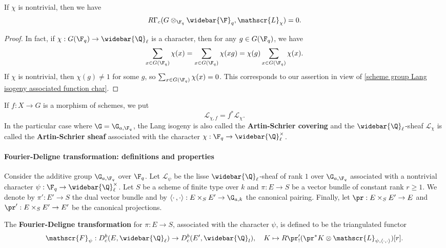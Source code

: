 \begin{proposition}\label{scheme group Lang isogeny cohomology trivial}
If $\chi$ is nontrivial, then we have
\begin{equation}\label{scheme group Lang isogeny cohomology trivial-1}
R\Gamma_c(G\otimes_{\F_q}\widebar{\F}_q,\mathscr{L}_\chi)=0.
\end{equation}
\end{proposition}
\begin{proof}
In fact, if $\chi:G(\F_q)\to\widebar{\Q}_\ell$ is a character, then for any $g\in G(\F_q)$, we have
\[\sum_{x\in G(\F_q)}\chi(x)=\sum_{x\in G(\F_q)}\chi(xg)=\chi(g)\sum_{x\in G(\F_q)}\chi(x).\]
If $\chi$ is nontrivial, then $\chi(g)\neq 1$ for some $g$, so $\sum_{x\in G(\F_q)}\chi(x)=0$. This corresponds to our assertion in view of \cref{scheme group Lang isogeny associated function char}.
\end{proof}

If $f:X\to G$ is a morphism of schemes, we put
\[\mathscr{L}_{\chi,f}=f^*\mathscr{L}_\chi.\]
In the particular case where $\G=\G_{a,\F_q}$, the Lang isogeny is also called the \textbf{Artin-Schrier covering} and the $\widebar{\Q}_\ell$-sheaf $\mathscr{L}_\chi$ is called the \textbf{Artin-Schrier sheaf} associated with the character $\chi:\F_q\to\widebar{\Q}_\ell^\times$.

\paragraph{Fourier-Deligne transformation: definitions and properties}
Consider the additive group $\G_{a,\F_q}$ over $\F_q$. Let $\mathscr{L}_\psi$ be the lisse $\widebar{\Q}_\ell$-sheaf of rank $1$ over $\G_{a,\F_q}$ associated with a nontrivial character $\psi:\F_q\to\widebar{\Q}_\ell^\times$. Let $S$ be a scheme of finite type over $k$ and $\pi:E\to S$ be a vector bundle of constant rank $r\geq 1$. We denote by $\pi':E'\to S$ the dual vector bundle and by $\langle\cdot\,,\cdot\rangle:E\times_SE'\to\G_{a,k}$ the canonical pairing. Finally, let $\pr:E\times_SE'\to E$ and $\pr':E\times_SE'\to E'$ be the canonical projections.

\begin{definition}
The \textbf{Fourier-Deligne transformation} for $\pi:E\to S$, associated with the character $\psi$, is defined to be the triangulated functor
\[\mathscr{F}_\psi:D^b_c(E,\widebar{\Q}_\ell)\to D^b_c(E',\widebar{\Q}_l),\quad K\mapsto R\pr'_!(\pr^*K\otimes\mathscr{L}_{\psi,\langle\cdot,\cdot\rangle})[r].\]
\end{definition}

